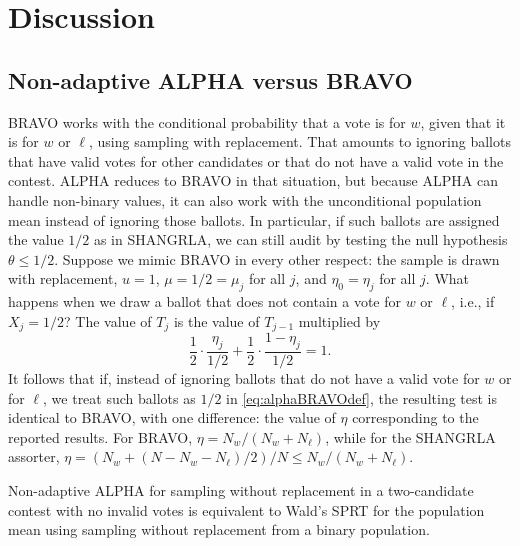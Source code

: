 \documentclass[12pt,runningheads]{llncs}
\begin{document}
{\section{Discussion}

\subsection{Non-adaptive ALPHA versus BRAVO}
BRAVO works with the conditional probability that a vote is for $w$, given that it is for $w$ or $\ell$,
using sampling with replacement.
That amounts to ignoring ballots that have valid votes for other candidates or that do not have a valid 
vote in the contest.
 ALPHA reduces to BRAVO in that situation, but because ALPHA can handle non-binary
values, it can also work with the unconditional population mean instead of ignoring those ballots.
In particular, if such ballots are assigned the value $1/2$ as in SHANGRLA, we can still audit by testing the
null hypothesis $\theta \le 1/2$.
Suppose we mimic BRAVO in every other respect: the sample is drawn with replacement, $u=1$, 
$\mu = 1/2 = \mu_j$ for all $j$, and $\eta_0 = \eta_j$ for all $j$.
What happens when we draw a ballot that does not contain a vote for $w$ or $\ell$, i.e., if $X_j = 1/2$?
The value of $T_j$ is the value of $T_{j-1}$ multiplied by
\begin{equation}
   \frac{1}{2} \cdot \frac{\eta_j}{1/2} + \frac{1}{2} \cdot \frac{1-\eta_j}{1/2} =  1.
\end{equation}
It follows that if, instead of ignoring ballots that do not have a valid vote for $w$ or for $\ell$, we treat such ballots as
$1/2$ in \ref{eq:alphaBRAVOdef}, the resulting test is identical to BRAVO, with one difference: the value of $\eta$
corresponding to the reported results.
For BRAVO, $\eta = N_w/(N_w+N_\ell)$, while for the SHANGRLA assorter,  $\eta = (N_w + (N-N_w-N_\ell)/2)/N \le N_w/(N_w+N_\ell)$.

Non-adaptive ALPHA for sampling without replacement in a two-candidate contest with no invalid votes is equivalent
to Wald's SPRT for the population mean using sampling without replacement from a binary population.

}
\end{document}
